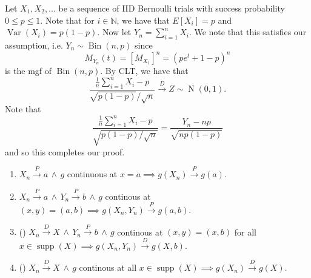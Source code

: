 \documentclass[notoc,notitlepage]{tufte-book}
\DeclareMathOperator{\Bin}{Bin }
\DeclareMathOperator{\Nor}{N }
\DeclareMathOperator{\Var}{Var }
\DeclareMathOperator{\supp}{supp }
\newcommand{\convd}{\overset{D}{\to}}
\newcommand{\convp}{\overset{P}{\to}}
\begin{document}
\begin{solution}
  Let $X_1, X_2, ...$ be a sequence of IID Bernoulli trials with success probability $0 \leq p \leq 1$. Note that for $i \in \mathbb{N}$, we have that $E[X_i] = p$ and $\Var(X_i) = p(1 - p)$. Now let $Y_n = \sum_{i=1}^{n} X_i$. We note that this satisfies our assumption, i.e. $Y_n \sim \Bin(n, p)$ since
  \begin{equation*}
    M_{Y_n}(t) = [ M_{X_1} ]^n = (pe^t + 1 - p)^n
  \end{equation*}
  is the mgf of $\Bin(n, p)$. By CLT, we have that
  \begin{equation*}
    \frac{\frac{1}{n} \sum_{i=1}^{n} X_i - p}{\sqrt{ p(1 - p) } / \sqrt{n}} \convd Z \sim \Nor(0, 1).
  \end{equation*}
  Note that
  \begin{equation*}
    \frac{\frac{1}{n} \sum_{i=1}^{n} X_i - p}{\sqrt{p (1 - p) / \sqrt{n}}} = \frac{Y_n - np}{\sqrt{np(1 - p)}}
  \end{equation*}
  and so this completes our proof.
\end{solution}

\begin{propo}
\label{propo:other_limit_theorems}
  \begin{enumerate}
    \item $X_n \convp a \, \land \, g$ continuous at $x = a \implies g(X_n) \convp g(a)$.
    \item $X_n \convp a \, \land \, Y_n \convp b \, \land \, g$ continous at $(x, y) = (a, b) \implies g(X_n, Y_n) \convp g(a, b)$.
    \item () $X_n \convd X \, \land \, Y_n \convp b \, \land \, g$ continous at $(x, y) = (x, b)$ for all $x \in \supp( X ) \implies g(X_n, Y_n) \convd g(X, b)$.
    \item () $X_n \convd X \, \land \, g$ continous at all $x \in \supp(X) \implies g(X_n) \convd g(X)$.
  \end{enumerate}
\end{propo}
\end{document}

